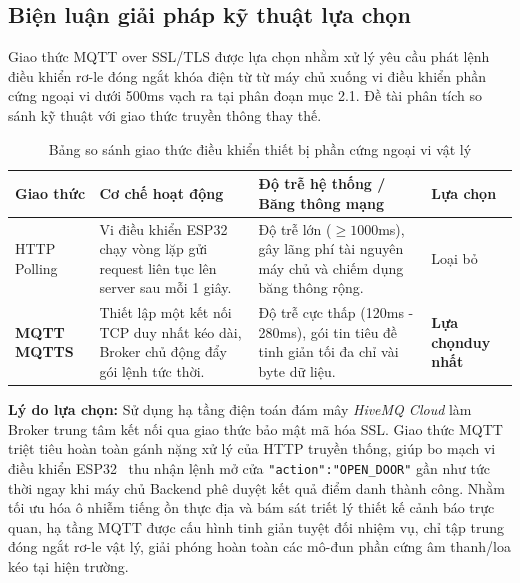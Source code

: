 ﻿\documentclass[../DoAn.tex]{subfiles}
\begin{document}
\subsection{Biện luận giải pháp kỹ thuật lựa chọn}

Giao thức MQTT over SSL/TLS được lựa chọn nhằm xử lý yêu cầu phát lệnh điều khiển rơ-le đóng ngắt khóa điện từ từ máy chủ xuống vi điều khiển phần cứng ngoại vi dưới 500ms vạch ra tại phân đoạn mục 2.1. Đề tài phân tích so sánh kỹ thuật với giao thức truyền thông thay thế.

\begin{table}[ht!]
\centering
\small
\renewcommand{\arraystretch}{1.3}
\caption{Bảng so sánh giao thức điều khiển thiết bị phần cứng ngoại vi vật lý}
\label{tab:mqtt_comparison}
\begin{tabular}{|>{\raggedright\arraybackslash}p{2.3cm}|>{\raggedright\arraybackslash}p{4.5cm}|>{\raggedright\arraybackslash}p{5.5cm}|>{\centering\arraybackslash}p{1.7cm}|}
\hline
\textbf{Giao thức} & \textbf{Cơ chế hoạt động} & \textbf{Độ trễ hệ thống / Băng thông mạng} & \textbf{Lựa chọn} \\ \hline
HTTP Polling & Vi điều khiển ESP32 chạy vòng lặp gửi request liên tục lên server sau mỗi 1 giây. & Độ trễ lớn ($\ge 1000$ms), gây lãng phí tài nguyên máy chủ và chiếm dụng băng thông rộng. & Loại bỏ \\ \hline
\textbf{MQTT MQTTS} & Thiết lập một kết nối TCP duy nhất kéo dài, Broker chủ động đẩy gói lệnh tức thời. & Độ trễ cực thấp (120ms - 280ms), gói tin tiêu đề tinh giản tối đa chỉ vài byte dữ liệu. & \textbf{Lựa chọn\newline duy nhất} \\ \hline
\end{tabular}
\end{table}

\textbf{Lý do lựa chọn:} Sử dụng hạ tầng điện toán đám mây \textit{HiveMQ Cloud} làm Broker trung tâm kết nối qua giao thức bảo mật mã hóa SSL. Giao thức MQTT triệt tiêu hoàn toàn gánh nặng xử lý của HTTP truyền thống, giúp bo mạch vi điều khiển ESP32~\cite{espressif2023} thu nhận lệnh mở cửa \texttt{"action":"OPEN\_DOOR"} gần như tức thời ngay khi máy chủ Backend phê duyệt kết quả điểm danh thành công. Nhằm tối ưu hóa ô nhiễm tiếng ồn thực địa và bám sát triết lý thiết kế cảnh báo trực quan, hạ tầng MQTT được cấu hình tinh giản tuyệt đối nhiệm vụ, chỉ tập trung đóng ngắt rơ-le vật lý, giải phóng hoàn toàn các mô-đun phần cứng âm thanh/loa kéo tại hiện trường.

\clearpage
\end{document}

